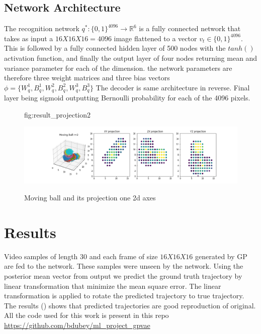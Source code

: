 \documentclass{jmlr} %
\begin{document}
\subsection{Network Architecture}

The recognition network $q^* : \{0,1\}^{4096} \to \mathbb{R}^6$ is a fully connected network that takes as
input a $16 X 16 X 16 = 4096$ image flattened to a vector $v_t \in \{0,1\}^{4096} $. This is followed by a fully
connected hidden layer of 500 nodes with the $tanh()$ activation function, and finally the output layer of four nodes returning 
mean and variance parameter for each of the dimension. the network
parameters are therefore three weight matrices and three bias vectors $\phi = \{W_q^1, B_q^1, W_q^2, B_q^2, W_q^3, B_q^3\}$
The decoder is same architecture in reverse. Final layer being sigmoid outputting Bernoulli probability for each of the 4096 pixels.
\begin{figure}[htpb]
\floatconts
  {fig:result_projection2}
  {\caption{Moving ball and its projection one 2d axes}}
    {\includegraphics[width=0.95\linewidth]{GPVAE3D/images/result_projection2}}
\end{figure}
\section{Results}
Video samples of length 30 and each frame of size $16X16X16$ generated by GP are fed to the network. These samples were unseen by the network. Using the posterior mean vector from output we predict the ground truth trajectory by linear transformation that minimize the mean square error. The linear transformation is applied to rotate the predicted trajectory to true trajectory. The results () shows that predicted trajectories are good reproduction of original. All the code used for this work is present in this repo \url{https://github.com/bdubey/ml_project_gpvae} 
\end{document}

